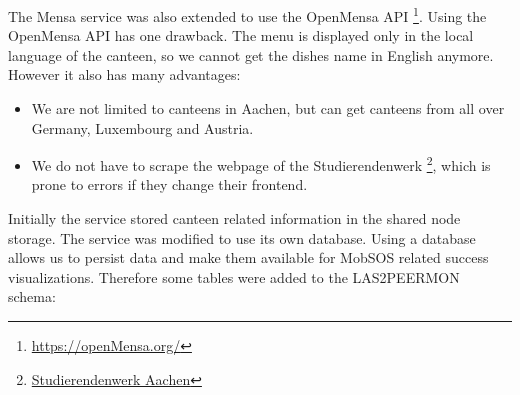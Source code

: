 The Mensa service was also extended to use the OpenMensa API \footnote{\url{https://openMensa.org/}}. 
Using the OpenMensa API has one drawback. The menu is displayed only in the local language of the canteen, so we cannot get the dishes name in English anymore.
However it also has many advantages:
\begin{itemize}
    \item We are not limited to canteens in Aachen, but can get canteens from all over Germany, Luxembourg and Austria. 
    \item We do not have to scrape the  webpage of the Studierendenwerk \footnote{\href{https://www.studierendenwerk-aachen.de/}{Studierendenwerk Aachen}}, which is prone to errors if they change their frontend.
\end{itemize}
Initially the service stored canteen related information in the shared node storage. The service was modified to use its own database. Using a database allows us to persist data and make them available for MobSOS related success visualizations. 
Therefore some tables were added to the LAS2PEERMON schema:

